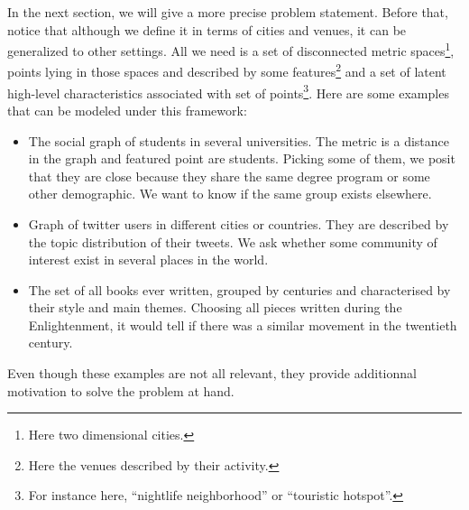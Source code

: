 In the next section, we will give a more precise problem statement. Before
that, notice that although we define it in terms of cities and venues, it can
be generalized to other settings. All we need is a set of disconnected metric
spaces\footnote{Here two dimensional cities.}, points lying in those spaces
and described by some features\footnote{Here the venues described by their
activity.} and a set of latent high-level characteristics associated with set
of points\footnote{For instance here, \enquote{nightlife neighborhood} or
\enquote{touristic hotspot}.}. Here are some examples that can be modeled
under this framework:
\begin{itemize}
	\item The social graph of students in several universities. The
		metric is a distance in the graph and featured point are
		students. Picking some of them, we posit that they are close because
        they share the same degree program or some other demographic. We
        want to know if the same group exists elsewhere.
	\item Graph of twitter users in different cities or countries. They are
        described by the topic distribution of their tweets. We ask whether
        some community of interest exist in several places in the world.
    \item The set of all books ever written, grouped by centuries and
        characterised by their style and main themes. Choosing all pieces
        written during the Enlightenment, it would tell if there was a
        similar movement in the twentieth century.
\end{itemize}
Even though these examples are not all relevant, they provide additionnal
motivation to solve the problem at hand.
